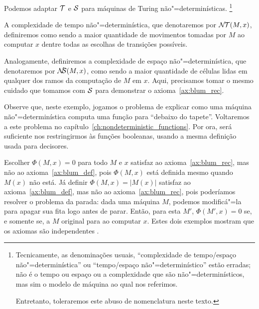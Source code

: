 \begin{example}
    \label{ex:nondeterministic_complexity}
    Podemos adaptar ${\mathcal{T}}$ e ${\mathcal{S}}$
    para máquinas de Turing não"=determinísticas.%
    \footnote{
        Tecnicamente,
        as denominações usuais,
        ``complexidade de tempo/espaço não"=determinística''
        ou ``tempo/espaço não"=determinístico''
        estão erradas;
        não é o tempo ou espaço ou a complexidade que são não"=determinísticos,
        mas sim o modelo de máquina ao qual nos referimos.

        Entretanto, toleraremos este abuso de nomenclatura neste texto.
    }

    A complexidade de tempo não"=determinística,
    que denotaremos por ${\mathcal{N\!T}}(M, x)$,
    definiremos como sendo a maior quantidade de movimentos
    tomadas por $M$ ao computar $x$
    dentre todas as escolhas de transições possíveis.

    Analogamente,
    definiremos a complexidade de espaço não"=determinística,
    que denotaremos por ${\mathcal{N\!\!S}}(M, x)$,
    como sendo a maior quantidade de células lidas
    em qualquer dos ramos da computação de $M$ em $x$.
    Aqui, precisamos tomar o mesmo cuidado que tomamos
    com ${\mathcal{S}}$ para demonstrar o axioma~\ref{ax:blum_rec}.
\end{example}

Observe que, neste exemplo,
jogamos o problema de
explicar como uma máquina não"=determinística computa uma função
para ``debaixo do tapete''.
Voltaremos a este problema no capítulo~\ref{ch:nondeterministic_functions}.
Por ora,
será suficiente nos restringirmos às funções booleanas,
usando a mesma definição usada para decisores.

\begin{example}
    Escolher $\Phi(M, x) = 0$ para todo $M$ e $x$
    satisfaz ao axioma~\ref{ax:blum_rec},
    mas não ao axioma~\ref{ax:blum_def},
    pois $\Phi(M, x)$ está definida mesmo quando $M(x)$ não está.
    Já definir $\Phi(M, x) = |M(x)|$
    satisfaz ao axioma~\ref{ax:blum_def},
    mas não ao axioma~\ref{ax:blum_rec},
    pois poderíamos resolver o problema da parada:
    dada uma máquina $M$, podemos modificá"=la
    para apagar sua fita logo antes de parar.
    Então, para esta $M'$,
    $\Phi(M', x) = 0$ se, e somente se,
    a $M$ original para ao computar $x$.
    Estes dois exemplos mostram que os axiomas são independentes
    \cite[p.~3]{Blum1967}.
\end{example}

